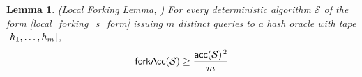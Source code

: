 \documentclass[psamsfonts, reqno]{amsart}
\newtheorem{lem}[thm]{Lemma}
\theoremstyle{definition}
\theoremstyle{remark}
\numberwithin{equation}{section}
\begin{document}
\begin{lem}\label{local_forking_lemma}
\textup{(\textit{Local Forking Lemma}, \cite{paper_bellare_local_forking})}
For every deterministic algorithm $\mathcal{S}$ of the form \eqref{local_forking_s_form} issuing $m$ distinct queries
to a hash oracle with tape
$[\hspace{0.5pt}h_1, \dots, h_m\hspace{0.5pt}]$,
\vspace{5pt}
\begin{equation}\label{local_forking_bound}
\mathsf{forkAcc}
	(
		\mathcal{S}
	)
	\ge
	\frac{
		\mathsf{acc}
		(
			\mathcal{S}
		) ^ {\hspace{1pt}2}
	}{m}
\vspace{5pt}
\end{equation}
\end{lem}
\end{document}

